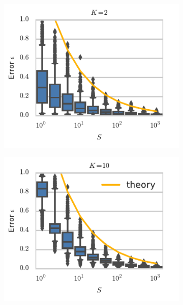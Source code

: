 \begin{figure}[t!]
  \centering
  \begin{subfigure}[b]{2.75in}
    \centering
    \includegraphics[width=\textwidth]{figures/ch9/error_vs_S_K2}
    \label{fig:error_vs_S_K2}
 \end{subfigure}
 \begin{subfigure}[b]{2.75in}
   \centering
   \includegraphics[width=\textwidth]{figures/ch9/error_vs_S_K10}
   \label{fig:error_vs_S_K10}

\end{subfigure}
\end{figure}
